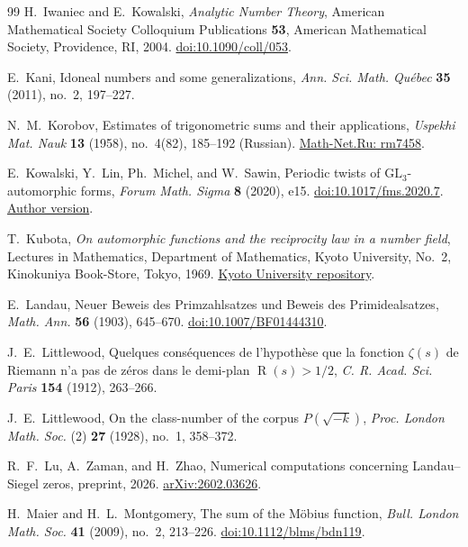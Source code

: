 \documentclass[11pt,a4paper]{article}
\numberwithin{equation}{section}
\numberwithin{figure}{section}
\theoremstyle{definition}
\theoremstyle{remark}
\begin{document}
\begin{thebibliography}{99}
H.~Iwaniec and E.~Kowalski,
\emph{Analytic Number Theory},
American Mathematical Society Colloquium Publications \textbf{53},
American Mathematical Society, Providence, RI, 2004.
\href{https://doi.org/10.1090/coll/053}{doi:10.1090/coll/053}.

E.~Kani,
Idoneal numbers and some generalizations,
\emph{Ann. Sci. Math. Qu\'ebec} \textbf{35} (2011), no.~2, 197--227.

N.~M.~Korobov,
Estimates of trigonometric sums and their applications,
\emph{Uspekhi Mat. Nauk} \textbf{13} (1958), no.~4(82),
185--192 (Russian).
\href{https://www.mathnet.ru/eng/rm7458}{Math-Net.Ru: rm7458}.

E.~Kowalski, Y.~Lin, Ph.~Michel, and W.~Sawin,
Periodic twists of $\mathrm{GL}_3$-automorphic forms,
\emph{Forum Math. Sigma} \textbf{8} (2020), e15.
\href{https://doi.org/10.1017/fms.2020.7}{doi:10.1017/fms.2020.7}.
\href{https://people.math.ethz.ch/~kowalski/gl3-twists.pdf}{Author version}.

T.~Kubota,
\emph{On automorphic functions and the reciprocity law in a number field},
Lectures in Mathematics, Department of Mathematics, Kyoto University,
No.~2, Kinokuniya Book-Store, Tokyo, 1969.
\href{https://hdl.handle.net/2433/84907}{Kyoto University repository}.

E.~Landau,
Neuer Beweis des Primzahlsatzes und Beweis des Primidealsatzes,
\emph{Math. Ann.} \textbf{56} (1903), 645--670.
\href{https://doi.org/10.1007/BF01444310}{doi:10.1007/BF01444310}.

J.~E.~Littlewood,
Quelques cons\'equences de l'hypoth\`ese que la fonction $\zeta(s)$ de
Riemann n'a pas de z\'eros dans le demi-plan $\operatorname{R}(s)>1/2$,
\emph{C. R. Acad. Sci. Paris} \textbf{154} (1912), 263--266.

J.~E.~Littlewood,
On the class-number of the corpus $P(\sqrt{-k})$,
\emph{Proc. London Math. Soc.} (2) \textbf{27} (1928),
no.~1, 358--372.

R.~F.~Lu, A.~Zaman, and H.~Zhao,
Numerical computations concerning Landau--Siegel zeros,
preprint, 2026.
\href{https://arxiv.org/abs/2602.03626}{arXiv:2602.03626}.

H.~Maier and H.~L.~Montgomery,
The sum of the M\"obius function,
\emph{Bull. London Math. Soc.} \textbf{41} (2009), no.~2, 213--226.
\href{https://doi.org/10.1112/blms/bdn119}
{doi:10.1112/blms/bdn119}.


\end{thebibliography}
\end{document}

